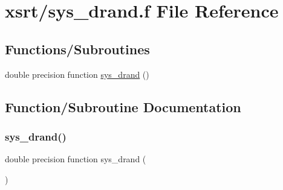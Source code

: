 \hypertarget{sys__drand_8f}{}\section{xsrt/sys\+\_\+drand.f File Reference}
\label{sys__drand_8f}
\subsection*{Functions/\+Subroutines}
\begin{DoxyCompactItemize}
\item 
double precision function \hyperlink{sys__drand_8f_a0dd1bfc0b3f68d82d8599cf828126e2a}{sys\+\_\+drand} ()
\end{DoxyCompactItemize}


\subsection{Function/\+Subroutine Documentation}
\mbox{\label{sys__drand_8f_a0dd1bfc0b3f68d82d8599cf828126e2a}} 
\subsubsection{\texorpdfstring{sys\+\_\+drand()}{sys\_drand()}}
{\footnotesize\ttfamily double precision function sys\+\_\+drand (\begin{DoxyParamCaption}{ }\end{DoxyParamCaption})}

